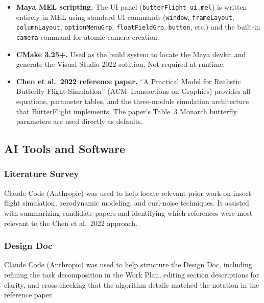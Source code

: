 \documentclass[12pt]{article}
\begin{document}
\begin{itemize}
  \item \textbf{Maya MEL scripting.} The UI panel
    (\texttt{butterFlight\_ui.mel}) is written entirely in MEL using standard
    UI commands (\texttt{window}, \texttt{frameLayout}, \texttt{columnLayout},
    \texttt{optionMenuGrp}, \texttt{floatFieldGrp}, \texttt{button}, etc.)
    and the built-in \texttt{camera} command for atomic camera creation.

  \item \textbf{CMake 3.25+.} Used as the build system to locate the Maya
    devkit and generate the Visual Studio 2022 solution. Not required at
    runtime.

  \item \textbf{Chen et al.\ 2022 reference paper.} ``A Practical Model for
    Realistic Butterfly Flight Simulation'' (ACM Transactions on Graphics)
    provides all equations, parameter tables, and the three-module simulation
    architecture that ButterFlight implements. The paper's Table~3 Monarch
    butterfly parameters are used directly as defaults.
\end{itemize}


\subsection{AI Tools and Software}

\subsubsection{Literature Survey}

Claude Code (Anthropic) was used to help locate relevant prior work on
insect flight simulation, aerodynamic modeling, and curl-noise techniques.
It assisted with summarizing candidate papers and identifying which
references were most relevant to the Chen et al.\ 2022 approach.

\subsubsection{Design Doc}

Claude Code (Anthropic) was used to help structure the Design Doc,
including refining the task decomposition in the Work Plan, editing
section descriptions for clarity, and cross-checking that the algorithm
details matched the notation in the reference paper.
\end{document}
